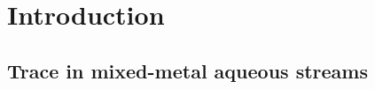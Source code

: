 %
%
\section{Introduction}
\label{sec:introduction}


\subsection{Trace \PbII{} in mixed-metal aqueous streams}
\label{sec:problem}

